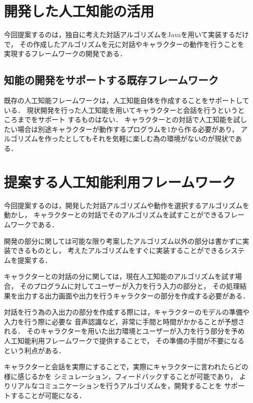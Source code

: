 \section{開発した人工知能の活用}
今回提案するのは，独自に考えた対話アルゴリズムをJavaを用いて実装するだけで，
その作成したアルゴリズムを元に対話やキャラクターの動作を行うことを実現するフレームワークの開発である．

\subsection{知能の開発をサポートする既存フレームワーク}
既存の人工知能フレームワークは，人工知能自体を作成することをサポートしている．
現状開発を行った人工知能を用いてキャラクターと会話を行うというところまでをサポート
するものはない．
キャラクターとの対話で人工知能を試したい場合は別途キャラクターが動作するプログラムを1から作る必要があり，
アルゴリズムを作ったとしてもそれを気軽に楽しむ為の環境がないのが現状である．

\section{提案する人工知能利用フレームワーク}
今回提案するのは，開発した対話アルゴリズムや動作を選択するアルゴリズムを動かし，
キャラクターとの対話でそのアルゴリズムを試すことができるフレームワークである．

開発の部分に関しては可能な限り考案したアルゴリズム以外の部分は書かずに実装できるものとし，
考えたアルゴリズムをすぐに実装することができるシステムを提案する．

キャラクターとの対話の分に関しては，現在人工知能のアルゴリズムを試す場合，
そのプログラムに対してユーザーが入力を行う入力の部分と，
その処理結果を出力する出力画面や出力を行うキャラクターの部分を作成する必要がある．

対話を行う為の入出力の部分を作成する際には，キャラクターのモデルの準備や入力を行う際に必要な
音声認識など，非常に手間と時間がかかることが予想される．
そのキャラクターを用いた出力環境とユーザーが入力を行う部分を予め人工知能利用フレームワークで提供することで，
その準備の手間が不要になるという利点がある．

キャラクターと会話を実際にすることで，実際にキャラクターに言われたらどの様に感じるかを
シミュレーション，フィードバックすることが可能であり，
よりリアルなコミュニケーションを行うアルゴリズムを，開発することを
サポートすることが可能になる．


